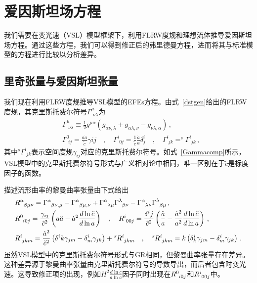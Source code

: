 \documentclass[jkps,preprint,fleqn]{revtex4}
\newcommand{\tc}{\tilde{c}}
\begin{document}
\section{爱因斯坦场方程} \label{sec:EFEs}

我们需要在变光速（VSL）模型框架下，利用FLRW度规和理想流体推导爱因斯坦场方程。通过这些方程，我们可以得到修正后的弗里德曼方程，进而将其与标准模型的方程进行比较以分析差异。
\subsection{里奇张量与爱因斯坦张量}\label{subsec:RS}
我们现在利用FLRW度规推导VSL模型的EFEs方程\cite{Lee:2020zts,Lee:2025rpw}。由式~\eqref{dstgen}给出的FLRW度规，其克里斯托费尔符号$\Gamma^{\mu}_{\,\,\nu\lambda}$为
\begin{align}
&\Gamma^{\mu}_{\,\,\nu\lambda} \equiv \frac{1}{2} g^{\mu\alpha} \left( g_{\alpha\nu,\lambda} + g_{\alpha\lambda,\nu} - g_{\nu\lambda,\alpha} \right) \label{Gamma}\,, \\ &\Gamma^{0}_{\,\,ij} = \frac{a\dot{a}}{\tc} \gamma{ij} \quad , \quad \Gamma^{i}_{\,\,0j} = \frac{1}{\tc}  \frac{\dot{a}}{a} \delta^i_j \quad , \quad \Gamma^{i}_{\,\,jk} = ^{s}\Gamma^{i}_{\,\,jk}  \label{Gammacomp} \,, \end{align}
其中$^{s}\Gamma^{i}_{\,\,jk}$表示空间度规$\gamma_{ij}$对应的克里斯托费尔符号。如式~\eqref{Gammacomp}所示，VSL模型中的克里斯托费尔符号形式与广义相对论中相同，唯一区别在于$\tc$是标度因子的函数。

描述流形曲率的黎曼曲率张量由下式给出
\begin{align}
&\tensor{R}{^\alpha_\beta_\mu_\nu} = \tensor{\Gamma}{^\alpha_\beta_\nu_,_\mu} - \tensor{\Gamma}{^\alpha_\beta_\mu_,_\nu} + \tensor{\Gamma}{^\alpha_\lambda_\mu} \tensor{\Gamma}{^\lambda_\beta_\nu} - \tensor{\Gamma}{^\alpha_\lambda_\nu} \tensor{\Gamma}{^\lambda_\beta_\mu} \label{Rabmu} \,, \\ &\tensor{R}{^0_i_0_j} = \frac{\gamma_{ij}}{\tc^2} \left( a \ddot{a} - \dot{a}^2 \frac{d \ln \tc}{d \ln a} \right) \quad , \quad \tensor{R}{^i_0_0_j} = \frac{\delta^{i}{j}}{\tc^2} \left( \frac{\ddot{a}}{a} - \frac{\dot{a}^2}{a^2} \frac{d \ln \tc}{ d \ln a}  \right) \,, \label{R0i0j} \\ &\tensor{R}{^i_j_k_m} = \frac{\dot{a}^2}{\tc^2} \left( \delta^{i}{k} \gamma_{jm} - \delta^i_m \gamma_{jk} \right) + \tensor[^s]{R}{^i_j_k_m} \quad , \quad \tensor[^s]{R}{^i_j_k_m} = k \left( \delta^i_k \gamma_{jm} - \delta^i_m \gamma_{jk} \right) \,. \label{Rijkm} \end{align}
虽然VSL模型中的克里斯托费尔符号形式与GR相同，但黎曼曲率张量存在差异。这种差异源于黎曼曲率张量由克里斯托费尔符号的导数导出，而后者包含时变光速。这导致修正项的出现，例如$H^2 \frac{d \ln \tc}{d \ln a}$因子同时出现在$\tensor{R}{^0_i_0_j}$和$\tensor{R}{^i_0_0_j}$中。
\end{document}
